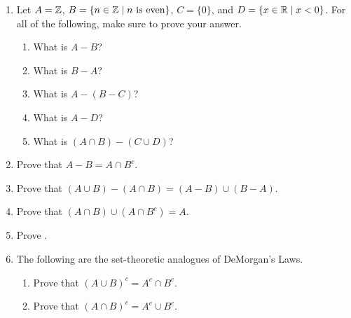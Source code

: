 \probsec{~\ref{sec:compl-set-diff}}
\begin{enumerate}
    \item Let $A = \mathbb{Z}$, $B = \{n \in \mathbb{Z} \mid n \text{ is even}\}$, $C = \{0\}$, and $D = \{x \in \mathbb{R} \mid x <0\}$. For all of the following, make sure to prove your answer.
  \begin{enumerate}
      \item What is $A - B$?
      \item What is $B - A$?
      \item What is $A - (B - C)$?
      \item What is $A - D$?
      \item What is $(A \cap B) - (C \cup D)$?
  \end{enumerate}

    \item Prove that $A - B = A \cap B^c$.

    \item Prove that $(A \cup B) - (A \cap B) = (A - B) \cup (B - A)$.

    \item Prove that $(A \cap B) \cup (A \cap B^c) = A$.

    \item Prove .

    \item The following are the set-theoretic analogues of DeMorgan's Laws.
  \begin{enumerate}
      \item Prove that $(A \cup B)^c = A^c \cap B^c$.
      \item Prove that $(A \cap B)^c = A^c \cup B^c$.
  \end{enumerate}

\end{enumerate}
